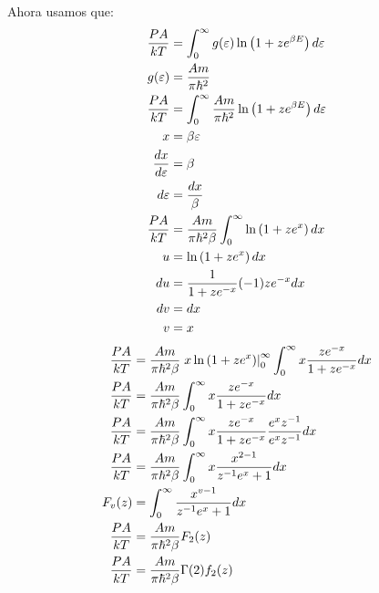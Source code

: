 \documentclass{report}
\begin{document}
Ahora usamos que:
\begin{align*}
  \frac{PA}{kT} &= \int^\infty_0 g(\varepsilon) \ln\left(1 + z e^{\beta E}\right)d\varepsilon\\
  g(\varepsilon) &= \frac{Am}{\pi \hbar^2}\\
  \frac{PA}{kT} &= \int^\infty_0 \frac{Am}{\pi \hbar^2} \ln\left(1 + z e^{\beta E}\right)d\varepsilon\\
  x &= \beta \varepsilon\\
  \frac{dx}{d\varepsilon} &= \beta\\
  d\varepsilon &= \frac{dx}{\beta}\\
  \frac{PA}{kT} &= \frac{Am}{\pi \hbar^2\beta} \int^\infty_0\ln\left(1 + z e^{x}\right)dx\\
  u &= \ln\left(1 + z e^{x}\right)dx\\
  du &= \frac{1}{1 + ze^{-x}}(-1) z e^{-x} dx\\
  dv &= dx\\
  v &= x
\end{align*}
\begin{align*}
  \frac{PA}{kT} &= \frac{Am}{\pi \hbar^2\beta} \left.x\ln\left(1 + z e^{x}\right)\right|_0^\infty \int^\infty_0 x \frac{z e^{-x}}{1 + ze^{-x}}dx\\
  \frac{PA}{kT} &= \frac{Am}{\pi \hbar^2\beta} \int^\infty_0 x \frac{z e^{-x}}{1 + ze^{-x}}dx\\
  \frac{PA}{kT} &= \frac{Am}{\pi \hbar^2\beta} \int^\infty_0 x \frac{z e^{-x}}{1 + ze^{-x}}\frac{e^x z^{-1}}{e^x z^{-1}}dx\\
  \frac{PA}{kT} &= \frac{Am}{\pi \hbar^2\beta} \int^\infty_0 x \frac{x^{2 - 1}}{z^{-1}e^{x} + 1} dx\\
  F_v (z) &= \int_0^{\infty} \frac{x^{v - 1}}{z^{-1}e^{x} + 1} dx\\
  \frac{PA}{kT} &= \frac{Am}{\pi \hbar^2\beta} F_2(z)\\
  \frac{PA}{kT} &= \frac{Am}{\pi \hbar^2\beta} \Gamma(2)f_2(z)\\
\end{align*}

\section{}
\end{document}
